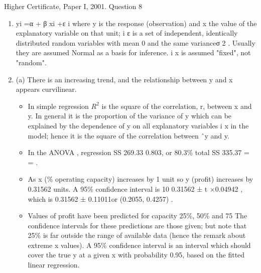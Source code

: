 \documentclass[a4paper,12pt]{article}
\begin{document}
Higher Certificate, Paper I, 2001. Question 8
\begin{enumerate}
\item  yi =α + β xi +ε i
where y is the response (observation) and x the value of the explanatory variable on
that unit; { } i
ε is a set of independent, identically distributed random variables with
mean 0 and the same varianceσ 2 . Usually they are assumed Normal as a basis for
inference. i x is assumed "fixed", not "random".
\item  (a) There is an increasing trend, and the relationship between y and x
appears curvilinear.
\begin{itemize}
\item In simple regression $R^2$ is the square of the correlation, r, between x
and y. In general it is the proportion of the variance of y which can be
explained by the dependence of y on all explanatory variables { } i x in the
model; hence it is the square of the correlation between ˆy and y.
\item In the ANOVA , regression SS 269.33 0.803, or 80.3\%
total SS 335.37
= = .
\item As x (\% operating capacity) increases by 1 unit so y (profit) increases
by 0.31562 units.
A 95\% confidence interval is 10 0.31562 ± t ×0.04942 , which is
0.31562 ± 0.11011or (0.2055, 0.4257) .
\item Values of profit have been predicted for capacity 25\%, 50\% and 75%
The confidence intervals for these predictions are those given; but note that
25\% is far outside the range of available data (hence the remark about extreme
x values). A 95\% confidence interval is an interval which should cover the
true y at a given x with probability 0.95, based on the fitted linear regression.
\end{itemize}


\end{enumerate}
\end{document}
